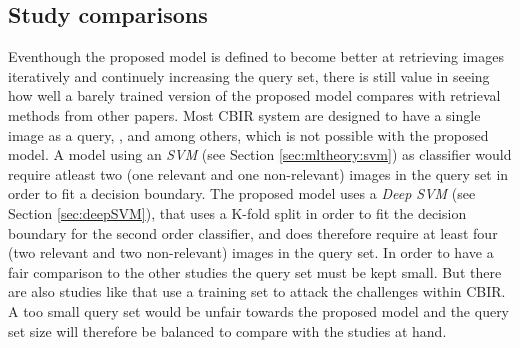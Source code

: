 \subsection{Study comparisons}
\label{sec:meth:eval:studycomp}

Eventhough the proposed model is defined to become better at retrieving images iteratively and continuely increasing the query set, there is still value in seeing how well a barely trained version of the proposed model compares with retrieval methods from other papers. Most CBIR system are designed to have a single image as a query, \cite{wang2001simplicity}, \cite{subrahmanyam2013modified} and \cite{nagaraja2015low} among others, which is not possible with the proposed model. A model using an \emph{SVM} (see Section \ref{sec:mltheory:svm}) as classifier would require atleast two (one relevant and one non-relevant) images in the query set in order to fit a decision boundary. The proposed model uses a \emph{Deep SVM} (see Section \ref{sec:deepSVM}), that uses a K-fold split in order to fit the decision boundary for the second order classifier, and does therefore require at least four (two relevant and two non-relevant) images in the query set. In order to have a fair comparison to the other studies the query set must be kept small. But there are also studies like \cite{elalami2014new} that use a training set to attack the challenges within CBIR. A too small query set would be unfair towards the proposed model and the query set size will therefore be balanced to compare with the studies at hand.

